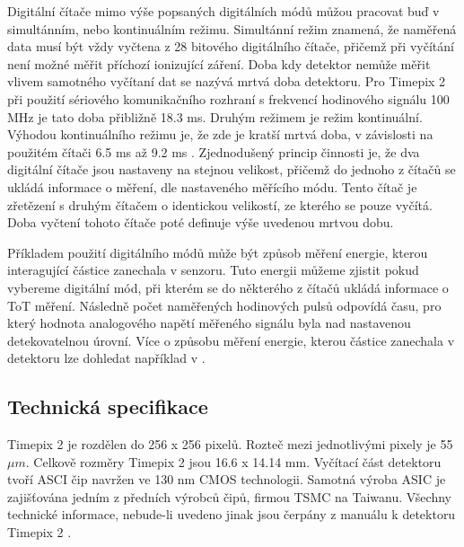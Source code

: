 \par Digitální čítače mimo výše popsaných digitálních módů můžou pracovat buď v simultánním, nebo kontinuálním režimu. Simultánní režim znamená, že naměřená data musí být vždy vyčtena z 28 bitového digitálního čítače, přičemž při vyčítání není možné měřit příchozí ionizující záření. Doba kdy detektor nemůže měřit vlivem samotného vyčítaní dat se nazývá mrtvá doba detektoru. Pro Timepix 2 při použití sériového komunikačního rozhraní s frekvencí hodinového signálu 100 MHz je tato doba přibližně 18.3 ms. Druhým režimem je režim kontinuální. Výhodou kontinuálního režimu je, že zde je kratší mrtvá doba, v závislosti na použitém čítači 6.5 ms až 9.2 ms . Zjednodušený princip činnosti je, že dva digitální čítače jsou nastaveny na stejnou velikost, přičemž do jednoho z čítačů se ukládá informace o měření, dle nastaveného měřícího módu. Tento čítač je zřetězení s druhým čítačem o identickou velikostí, ze kterého se pouze vyčítá. Doba vyčtení tohoto čítače poté definuje výše uvedenou mrtvou dobu.
\par Příkladem použití digitálního módů může být způsob měření energie, kterou interagující částice zanechala v senzoru. Tuto energii můžeme zjistit pokud vybereme digitální mód, při kterém se do některého z čítačů ukládá informace o ToT měření. Následně počet naměřených hodinových pulsů odpovídá času, pro který hodnota analogového napětí měřeného signálu byla nad nastavenou detekovatelnou úrovní. Více o způsobu měření energie, kterou částice zanechala v detektoru lze dohledat například v \cite{JAKUBEK2011S262}.


\subsection{Technická specifikace} %
\label{Technicka specifikace}
Timepix 2 je rozdělen do 256 x 256 pixelů. Rozteč mezi jednotlivými pixely je 55 $\mu$$m$. Celkově rozměry Timepix 2 jsou 16.6 x 14.14 mm. Vyčítací část detektoru tvoří ASCI čip navržen ve 130 nm CMOS technologii. Samotná výroba ASIC je zajišťována jedním z předních výrobců čipů, firmou TSMC \cite{TSMC} na Taiwanu. Všechny technické informace, nebude-li uvedeno jinak jsou čerpány z manuálu k detektoru Timepix 2 \cite{tpx2_manual}.

